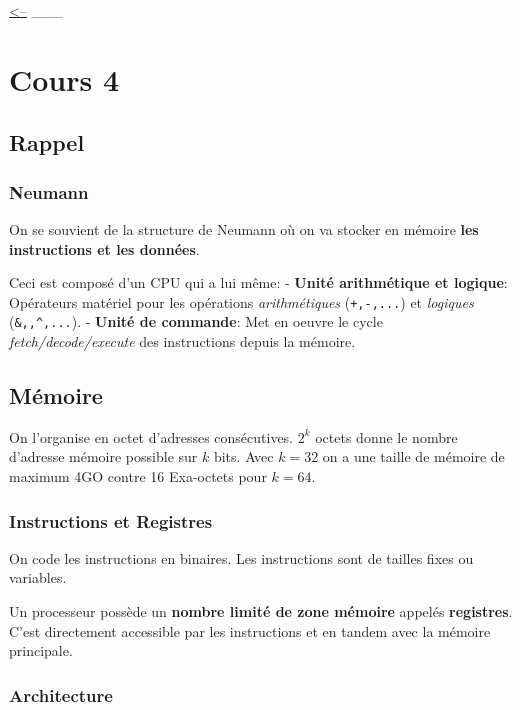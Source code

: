 \href{../README.md}{\textless--} \_\_\_

\section{Cours 4}\label{cours-4}

\subsection{Rappel}\label{rappel}

\subsubsection{Neumann}\label{neumann}

On se souvient de la structure de Neumann où on va stocker en mémoire
\textbf{les instructions et les données}.

Ceci est composé d'un CPU qui a lui même: - \textbf{Unité arithmétique
et logique}: Opérateurs matériel pour les opérations
\emph{arithmétiques} (\texttt{+,-,...}) et \emph{logiques}
(\texttt{\&,\textbar{},\^{},...}). - \textbf{Unité de commande}: Met en
oeuvre le cycle \emph{fetch/decode/execute} des instructions depuis la
mémoire.

\subsection{Mémoire}\label{muxe9moire}

On l'organise en octet d'adresses consécutives. \(2^k\) octets donne le
nombre d'adresse mémoire possible sur \(k\) bits. Avec \(k=32\) on a une
taille de mémoire de maximum 4GO contre 16 Exa-octets pour \(k=64\).

\subsubsection{Instructions et
Registres}\label{instructions-et-registres}

On code les instructions en binaires. Les instructions sont de tailles
fixes ou variables.

Un processeur possède un \textbf{nombre limité de zone mémoire} appelés
\textbf{registres}. C'est directement accessible par les instructions et
en tandem avec la mémoire principale.

\subsubsection{Architecture}\label{architecture}

